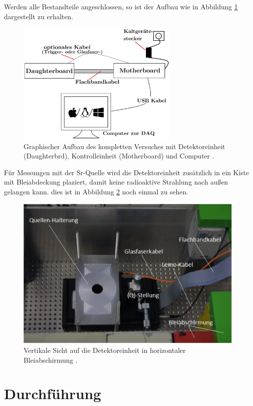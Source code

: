 Werden alle Bestandteile angeschlossen, so ist der Aufbau wie in Abbildung \ref{fig:aufbau} dargestellt zu erhalten.
\begin{figure}[htb]
  \centering
  \includegraphics[width=0.7\textwidth]{images/Aufbau.png}
  \caption{Graphischer Aufbau des kompletten Versuches mit Detektoreinheit (Daughterbrd), Kontrolleinheit (Motherboard) und Computer \cite{anleitung}.}
  \label{fig:aufbau}
\end{figure}
Für Messungen mit der Sr-Quelle wird die Detektoreinheit zusätzlich in ein Kiste
mit Bleiabdeckung plaziert, damit keine radioaktive Strahlung nach außen gelangen
kann. dies ist in Abbildung \ref{fig:quell} noch einmal zu sehen.
\begin{figure}[htb]
  \centering
  \includegraphics{images/Abschirmung.png}
  \caption{Vertikale Sicht auf die Detektoreinheit in horizontaler Bleiabschirmung \cite{anleitung}.}
  \label{fig:quell}
\end{figure}

\section{Durchführung}
\label{sec:Durchführung}

